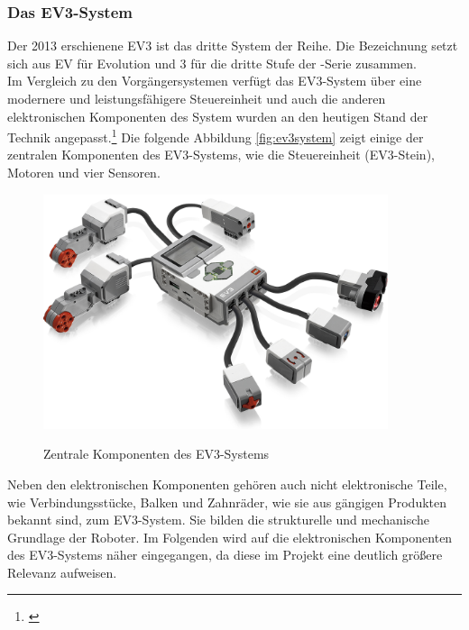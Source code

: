 \subsubsection{Das EV3-System}
Der 2013 erschienene EV3 ist das dritte System der \LM{} Reihe. Die Bezeichnung setzt sich aus EV für Evolution 
und 3 für die dritte Stufe der \LM{}-Serie zusammen. \\
Im Vergleich zu den Vorgängersystemen verfügt das EV3-System über eine modernere und leistungsfähigere Steuereinheit und auch die anderen elektronischen Komponenten des System wurden an den heutigen Stand der Technik 
angepasst.\footnote{\citep[vgl.][Das EV3 Roboter Universum, Seite 22]{Scholz.DasEV3}\label{note24}}
\medskip
\newline
Die folgende Abbildung \eqref{fig:ev3system} zeigt einige der zentralen Komponenten des EV3-Systems, wie die Steuereinheit (EV3-Stein), Motoren und vier Sensoren.
\begin{figure}[ht]
	\centering
	\includegraphics[width=0.90\textwidth]{images/technische_grundlagen/EV3-Overview.png}
	\caption[Zentrale Komponenten des EV3-Systems]{Zentrale Komponenten des EV3-Systems}
	\cite{NatinalInstruments.NILabVIEW}
	\label{fig:ev3system}
\end{figure}
\newline
Neben den elektronischen Komponenten gehören auch nicht elektronische Teile, wie Verbindungsstücke, Balken und Zahnräder, wie sie aus gängigen \LE{} Produkten bekannt sind, zum EV3-System. Sie bilden die strukturelle und mechanische Grundlage der Roboter.
\medskip
\newline
Im Folgenden wird auf die elektronischen Komponenten des EV3-Systems näher eingegangen, da diese im Projekt eine deutlich größere Relevanz aufweisen.
